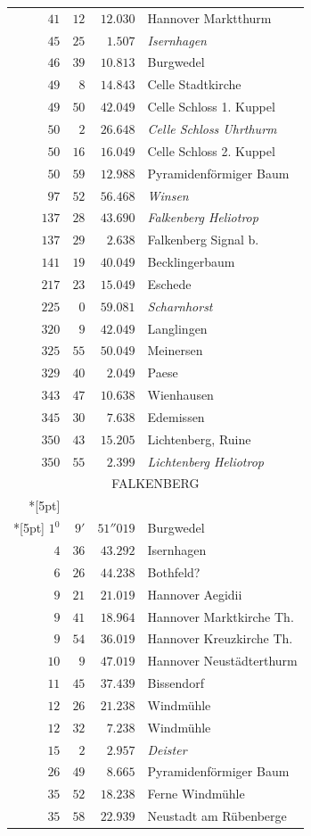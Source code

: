 \begin{longtable}{@{}rrrp{.61\linewidth}@{}}
\(41\)&\(12\)&\(12.030\)&\raggedright Hannover Marktthurm\tabularnewline
\(45\)&\(25\)&\(1.507\)&\raggedright \textit{Isernhagen}\tabularnewline
\(46\)&\(39\)&\(10.813\)&\raggedright Burgwedel\tabularnewline
\(49\)&\(8\)&\(14.843\)&\raggedright Celle Stadtkirche\tabularnewline
\(49\)&\(50\)&\(42.049\)&\raggedright Celle Schloss 1. Kuppel\tabularnewline
\(50\)&\(2\)&\(26.648\)&\raggedright \textit{Celle Schloss Uhrthurm}\tabularnewline
\(50\)&\(16\)&\(16.049\)&\raggedright Celle Schloss 2. Kuppel\tabularnewline
\(50\)&\(59\)&\(12.988\)&\raggedright Pyramidenförmiger Baum\tabularnewline
\(97\)&\(52\)&\(56.468\)&\raggedright \textit{Winsen}\tabularnewline
\(137\)&\(28\)&\(43.690\)&\raggedright \textit{Falkenberg Heliotrop}\tabularnewline
\(137\)&\(29\)&\(2.638\)&\raggedright Falkenberg Signal b.\tabularnewline
\(141\)&\(19\)&\(40.049\)&\raggedright Becklingerbaum\tabularnewline
\(217\)&\(23\)&\(15.049\)&\raggedright Eschede\tabularnewline
\(225\)&\(0\)&\(59.081\)&\raggedright \textit{Scharnhorst}\tabularnewline
\(320\)&\(9\)&\(42.049\)&\raggedright Langlingen\tabularnewline
\(325\)&\(55\)&\(50.049\)&\raggedright Meinersen\tabularnewline
\(329\)&\(40\)&\(2.049\)&\raggedright Paese\tabularnewline
\(343\)&\(47\)&\(10.638\)&\raggedright Wienhausen\tabularnewline
\(345\)&\(30\)&\(7.638\)&\raggedright Edemissen\tabularnewline
\(350\)&\(43\)&\(15.205\)&\raggedright Lichtenberg, Ruine\tabularnewline
\(350\)&\(55\)&\(2.399\)&\raggedright \textit{Lichtenberg Heliotrop}\tabularnewline
\multicolumn{4}{c}{\strut FALKENBERG}\\*[5pt]
\multicolumn{4}{c}{\(-146621.040\)\qquad\(+5142.567\)}\\*[5pt]
\(1^{0}\)&\(9'\)&\(51''019\)&\raggedright Burgwedel\tabularnewline
\(4\)&\(36\)&\(43.292\)&\raggedright Isernhagen\tabularnewline
\(6\)&\(26\)&\(44.238\)&\raggedright Bothfeld?\tabularnewline
\(9\)&\(21\)&\(21.019\)&\raggedright Hannover Aegidii\tabularnewline
\(9\)&\(41\)&\(18.964\)&\raggedright Hannover Marktkirche Th.\tabularnewline
\(9\)&\(54\)&\(36.019\)&\raggedright Hannover Kreuzkirche Th.\tabularnewline
\(10\)&\(9\)&\(47.019\)&\raggedright Hannover Neustädterthurm\tabularnewline
\(11\)&\(45\)&\(37.439\)&\raggedright Bissendorf\tabularnewline
\(12\)&\(26\)&\(21.238\)&\raggedright Windmühle\tabularnewline
\(12\)&\(32\)&\(7.238\)&\raggedright Windmühle\tabularnewline
\(15\)&\(2\)&\(2.957\)&\raggedright \textit{Deister}\tabularnewline
\(26\)&\(49\)&\(8.665\)&\raggedright Pyramidenförmiger Baum\tabularnewline
\(35\)&\(52\)&\(18.238\)&\raggedright Ferne Windmühle\tabularnewline
\(35\)&\(58\)&\(22.939\)&\raggedright Neustadt am Rübenberge\tabularnewline

\end{longtable}
